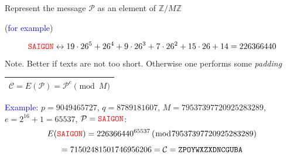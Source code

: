 \documentclass[landscape]{powersem} %
\newcommand{\psd}{\pause}%
\newcommand{\heading}[1]{%
 \begin{center}
  \large\bf
  \Ovalbox{{\textcolor{conceptcolor}{#1}}}%
 \end{center}
 \vspace{1ex minus 1ex}}
\begin{document}
\begin{slide}
\heading{Alice: Encryption}\psd

Represent the message ${\mathcal P}$ as an element of  ${\mathbb Z}/M{\mathbb Z}$\psd

(\textcolor{blue}{for example})\psd
\begin{scriptsize}
%
%
%


$$\texttt{\textcolor{red}{SAIGON}}\leftrightarrow
19\cdot26^5+26^4+9\cdot26^3+7\cdot26^2+15\cdot26+14=
                          226366440$$ Note. Better if texts are not too short. Otherwise one performs
some  \textsl{padding}
\end{scriptsize}\psd

\begin{Large}
\begin{center}\begin{tabular}{|c|}\hline
${\mathcal C}=E({\mathcal P})={\mathcal P}^e\pmod M$\\\hline\end{tabular}\end{center}
\end{Large}\psd

\scriptsize{ \textcolor{blue}{Example}: $p=9049465727$,
$q=8789181607$, $M=79537397720925283289 $, $e=2^{16}+1=65537$,
${\mathcal P}=\texttt{\textcolor{red}{SAIGON}}$:\psd
$$E(\texttt{\textcolor{red}{SAIGON}})=226366440^{65537}\,(\bmod 79537397720925283289)$$
$$=71502481501746956206={\mathcal C}=\texttt{\textcolor{black}{ZPOYWXZXDNCGUBA}}\hfill$$}
\end{slide}
\end{document}
